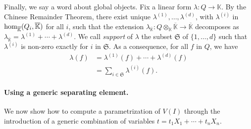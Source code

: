 \documentclass[12pt]{article}
\def\K {\ensuremath{\mathbb{K}}}
\def\Kbar {{\ensuremath{\overline{\mathbb{K}}}}}
\begin{document}
Finally, we say a word about global objects.  Fix a linear form $\lambda:
Q \to \K$. By the Chinese Remainder Theorem, there exist unique
$\lambda^{(1)},\dots,\lambda^{(d)}$, with $\lambda^{(i)}$ in ${\rm
  hom}_\Kbar(Q_i,\Kbar)$ for all $i$, such that the extension
$\lambda_\Kbar: Q\otimes_\K \Kbar \to \Kbar$ decomposes as $\lambda_\Kbar =
\lambda^{(1)} + \cdots + \lambda^{(d)}$. We call {\em support} of $\lambda$ the
subset $\mathfrak{S}$ of $\{1,\dots,d\}$ such that $\lambda^{(i)}$ is
non-zero exactly for $i$ in $\mathfrak{S}$.  As a consequence, for all
$f$ in $Q$, we have
\begin{align}\label{eq:fui}
\lambda(f) &= \lambda^{(1)}(f) + \cdots + \lambda^{(d)}(f)\nonumber\\
&=  \sum_{i \in \mathfrak{S}} \lambda^{(i)}(f).
\end{align}

\paragraph{Using a generic separating element.} We now show
how to compute a parametrization of $V(I)$ through the introduction
of a generic combination of variables $t=t_1 X_1 + \cdots +t_n X_n$.
\end{document}
